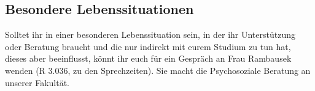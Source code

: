 \subsection{Besondere Lebenssituationen}
Solltet ihr in einer besonderen Lebenssituation sein, in der ihr 
Unterstützung oder Beratung braucht und die nur indirekt mit eurem 
Studium zu tun hat, dieses aber beeinflusst, könnt ihr euch für ein 
Gespräch an Frau Rambausek wenden (R 3.036, zu den Sprechzeiten). 
Sie macht die Psychosoziale Beratung an unserer Fakultät.
